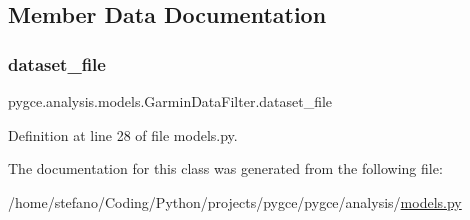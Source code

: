 \subsection{Member Data Documentation}
\mbox{\label{classpygce_1_1analysis_1_1models_1_1_garmin_data_filter_a7bb7be05577c2d31546e27823a5d11c5}} 
\subsubsection{\texorpdfstring{dataset\+\_\+file}{dataset\_file}}
{\footnotesize\ttfamily pygce.\+analysis.\+models.\+Garmin\+Data\+Filter.\+dataset\+\_\+file}



Definition at line 28 of file models.\+py.



The documentation for this class was generated from the following file\+:\begin{DoxyCompactItemize}
\item 
/home/stefano/\+Coding/\+Python/projects/pygce/pygce/analysis/\hyperlink{models_8py}{models.\+py}\end{DoxyCompactItemize}

